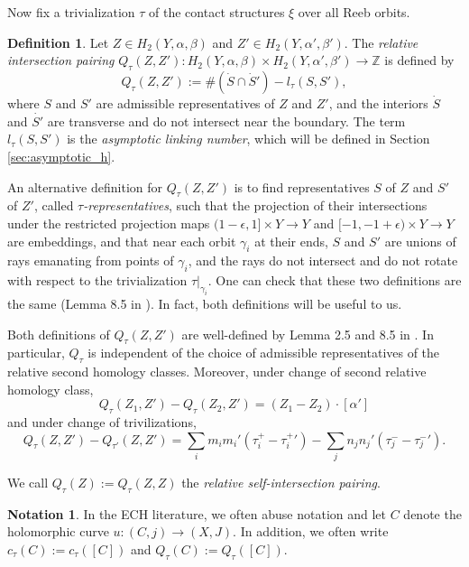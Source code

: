 \documentclass{article}
\numberwithin{equation}{section}
\theoremstyle{definition}
\newtheorem{definition}[theorem]{Definition}
\newtheorem{notation}[theorem]{Notation}
\begin{document}
Now fix a trivialization $\tau$ of the contact structures $\xi$ over all Reeb orbits.
\begin{definition}
\label{def:relative_intersection}
Let $Z\in H_2(Y, \alpha, \beta)$ and $Z'\in H_2(Y, \alpha', \beta')$. The \emph{relative intersection pairing} $Q_\tau(Z, Z'): H_2(Y, \alpha, \beta) \times H_2(Y, \alpha', \beta') \to \mathbb{Z}$ is defined by
$$Q_\tau(Z,Z') := \#(\dot{S} \cap \dot{S}') - l_\tau(S,S'),$$
where $S$ and $S'$ are admissible representatives of $Z$ and $Z'$, and the interiors $\dot{S}$ and $\dot{S'}$ are transverse and do not intersect near the boundary. The term $l_\tau(S,S')$ is the \emph{asymptotic linking number}, which will be defined in Section \ref{sec:asymptotic_h}.
\end{definition}

An alternative definition for $Q_\tau(Z,Z')$ is to find representatives $S$ of $Z$ and $S'$ of $Z'$, called \emph{$\tau$-representatives}, such that the projection of their intersections under the restricted projection maps $(1-\epsilon, 1] \times Y \to Y$ and $[-1, -1+\epsilon) \times Y \to Y$ are embeddings, and that near each orbit $\gamma_i$ at their ends, $S$ and $S'$ are unions of rays emanating from points of $\gamma_i$, and the rays do not intersect and do not rotate with respect to the trivialization $\tau|_{\gamma_i}$. One can check that these two definitions are the same (Lemma 8.5 in \cite{Hutchings_index_inequality}). In fact, both definitions will be useful to us. 

Both definitions of $Q_\tau(Z,Z')$ are well-defined by Lemma 2.5 and 8.5 in \cite{Hutchings_index_inequality}. In particular, $Q_\tau$ is independent of the choice of admissible representatives of the relative second homology classes. Moreover, under change of second relative homology class,
\begin{equation}
\label{eq:change_of_homology_class_for_Q_tau}
    Q_\tau(Z_1,Z') - Q_\tau(Z_2, Z') = (Z_1 - Z_2) \cdot [\alpha']
\end{equation}
and under change of trivilizations, 
\begin{equation}
    Q_\tau(Z, Z') - Q_{\tau'}(Z,Z') = \sum_i m_i {m_i}' ({\tau^+_i} - {\tau^+_i}') - \sum_j n_j {n_j}' ({\tau^-_j} - {\tau^-_j}').
\end{equation}

We call $Q_\tau(Z):=Q_\tau(Z,Z)$ the \emph{relative self-intersection pairing}.

\begin{notation}
In the ECH literature, we often abuse notation and let $C$ denote the holomorphic curve $u: (C,j) \to (X,J)$. In addition, we often write $c_\tau(C):=c_\tau([C])$ and $Q_\tau(C):=Q_\tau([C])$.
\end{notation}
\end{document}
